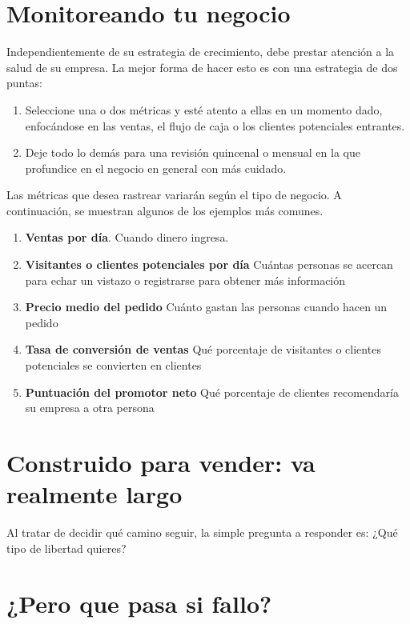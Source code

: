 \documentclass[10pt]{book}
\begin{document}
	\section{Monitoreando tu negocio}	
	    Independientemente de su estrategia de crecimiento, debe prestar atención a la salud de su empresa. La mejor forma de hacer esto es con una estrategia de dos puntas:
	   \begin{enumerate}[\bfseries 1)] 
		   \item Seleccione una o dos métricas y esté atento a ellas en un momento dado, enfocándose en las ventas, el flujo de caja o los clientes potenciales entrantes.
		    \item Deje todo lo demás para una revisión quincenal o mensual en la que profundice en el negocio en general con más cuidado.
	    \end{enumerate}
	    Las métricas que desea rastrear variarán según el tipo de negocio. A continuación, se muestran algunos de los ejemplos más comunes.
	    \begin{enumerate}[\bfseries 1)]
		\item \textbf{Ventas por día}. Cuando dinero ingresa.
		\item \textbf{Visitantes o clientes potenciales por día} Cuántas personas se acercan para echar un vistazo o registrarse para obtener más información
		\item \textbf{Precio medio del pedido} Cuánto gastan las personas cuando hacen un pedido
		\item \textbf{Tasa de conversión de ventas} Qué porcentaje de visitantes o clientes potenciales se convierten en clientes
		\item \textbf{Puntuación del promotor neto} Qué porcentaje de clientes recomendaría su empresa a otra persona
	    \end{enumerate}

	\section{Construido para vender: va realmente largo}
	    Al tratar de decidir qué camino seguir, la simple pregunta a responder es: ¿Qué tipo de libertad quieres?
	
	\section{¿Pero que pasa si fallo?}
\end{document}
